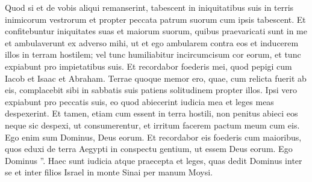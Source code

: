 \begin{biblechapter}
\begin{biblechapter}
\begin{biblechapter}
\begin{biblechapter}
\begin{biblechapter}
\begin{biblechapter}
\begin{biblechapter}
\begin{biblechapter}
\begin{biblechapter}
\begin{biblechapter}
\begin{biblechapter}
\begin{biblechapter}
\begin{biblechapter}
\begin{biblechapter}
\begin{biblechapter}
\begin{biblechapter}
\begin{biblechapter}
\begin{biblechapter}
\begin{biblechapter}
\begin{biblechapter}
\begin{biblechapter}
\begin{biblechapter}
\begin{biblechapter}
\begin{biblechapter}
\begin{biblechapter}
\begin{biblechapter}
\verse Quod si et de vobis aliqui remanserint, tabescent in iniquitatibus suis in terris inimicorum vestrorum et propter peccata patrum suorum cum ipsis tabescent. 
\verse Et confitebuntur iniquitates suas et maiorum suorum, quibus praevaricati sunt in me et ambulaverunt ex adverso mihi, 
\verse ut et ego ambularem contra eos et inducerem illos in terram hostilem; vel tunc humiliabitur incircumcisum cor eorum, et tunc expiabunt pro impietatibus suis. 
\verse Et recordabor foederis mei, quod pepigi cum Iacob et Isaac et Abraham. Terrae quoque memor ero, 
\verse quae, cum relicta fuerit ab eis, complacebit sibi in sabbatis suis patiens solitudinem propter illos. Ipsi vero expiabunt pro peccatis suis, eo quod abiecerint iudicia mea et leges meas despexerint.
 \verse Et tamen, etiam cum essent in terra hostili, non penitus abieci eos neque sic despexi, ut consumerentur, et irritum facerem pactum meum cum eis. Ego enim sum Dominus, Deus eorum. 
\verse Et recordabor eis foederis cum maioribus, quos eduxi de terra Aegypti in conspectu gentium, ut essem Deus eorum. Ego Dominus ”.
 \verse Haec sunt iudicia atque praecepta et leges, quas dedit Dominus inter se et inter filios Israel in monte Sinai per manum Moysi.
 

\end{biblechapter}
\end{biblechapter}
\end{biblechapter}
\end{biblechapter}
\end{biblechapter}
\end{biblechapter}
\end{biblechapter}
\end{biblechapter}
\end{biblechapter}
\end{biblechapter}
\end{biblechapter}
\end{biblechapter}
\end{biblechapter}
\end{biblechapter}
\end{biblechapter}
\end{biblechapter}
\end{biblechapter}
\end{biblechapter}
\end{biblechapter}
\end{biblechapter}
\end{biblechapter}
\end{biblechapter}
\end{biblechapter}
\end{biblechapter}
\end{biblechapter}
\end{biblechapter}
